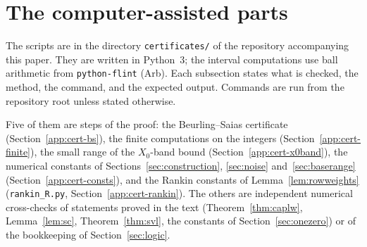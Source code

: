 \section{The computer-assisted parts}\label{app:cert}

The scripts are in the directory \texttt{certificates/} of the repository accompanying this paper. They are written in Python~3;
the interval computations use ball arithmetic from \texttt{python-flint} (Arb). Each subsection states what is checked, the
method, the command, and the expected output. Commands are run from the repository root unless stated otherwise.

Five of them are steps of the proof: the Beurling--Saias certificate (Section~\ref{app:cert-bs}), the finite computations on
the integers (Section~\ref{app:cert-finite}), the small range of the $X_0$-band bound (Section~\ref{app:cert-x0band}), the
numerical constants of Sections~\ref{sec:construction}, \ref{sec:noise} and~\ref{sec:baserange} (Section~\ref{app:cert-consts}), and the
Rankin constants of Lemma~\ref{lem:rowweights} (\texttt{rankin\_R.py}, Section~\ref{app:cert-rankin}). The
others are independent numerical cross-checks of statements proved in the text (Theorem~\ref{thm:caplw}, Lemma~\ref{lem:sc},
Theorem~\ref{thm:svl}, the constants of Section~\ref{sec:onezero}) or of the bookkeeping of Section~\ref{sec:logic}.

